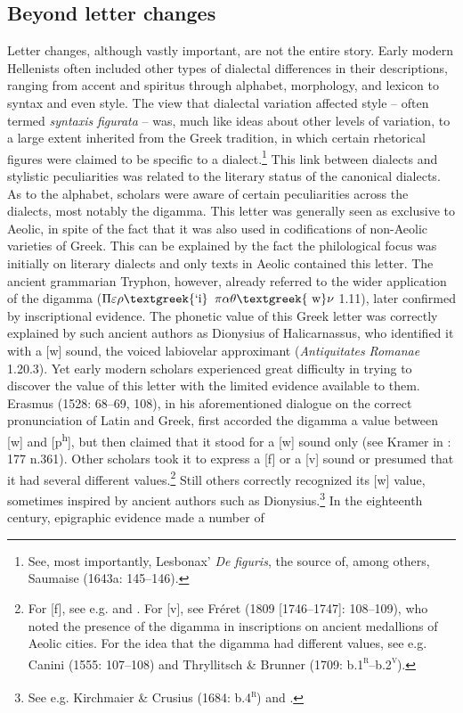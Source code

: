 \documentclass[output=paper]{langsci/langscibook}
\begin{document}
\subsection{Beyond letter changes}
\hypertarget{Toc19704846}{}\begin{styleCatalogusnotities}
Letter changes, although vastly important, are not the entire story. Early modern Hellenists often included other types of dialectal differences in their descriptions, ranging from accent and spiritus through alphabet, morphology, and lexicon to syntax and even style. The view that dialectal variation affected style – often termed \textit{syntaxis} \textit{figurata} – was, much like ideas about other levels of variation, to a large extent inherited from the Greek tradition, in which certain rhetorical figures were claimed to be specific to a dialect.\footnote{ \textrm{See, most importantly, Lesbonax’} \textrm{\textit{De} \textit{figuris}}\textrm{, the source of, among others, Saumaise (1643a: 145–146).}} This link between dialects and stylistic peculiarities was related to the literary status of the canonical dialects. As to the alphabet, scholars were aware of certain peculiarities across the dialects, most notably the digamma. This letter was generally seen as exclusive to Aeolic, in spite of the fact that it was also used in codifications of non-Aeolic varieties of Greek. This can be explained by the fact the philological focus was initially on literary dialects and only texts in Aeolic contained this letter. The ancient grammarian Tryphon, however, already referred to the wider application of the digamma ($\Pi \varepsilon \rho \text{\textgreek{`i}}$ $\pi \alpha \theta \text{\textgreek{~w}}\nu $ 1.11), later confirmed by inscriptional evidence. The phonetic value of this Greek letter was correctly explained by such ancient authors as Dionysius of Halicarnassus, who identified it with a [w] sound, the voiced labiovelar approximant (\textit{Antiquitates} \textit{Romanae} 1.20.3). Yet early modern scholars experienced great difficulty in trying to discover the value of this letter with the limited evidence available to them. Erasmus (1528: 68–69, 108), in his aforementioned dialogue on the correct pronunciation of Latin and Greek, first accorded the digamma a value between [w] and [p\textsuperscript{h}], but then claimed that it stood for a [w] sound only (see Kramer in \citealt{Erasmus1978}: 177 n.361). Other scholars took it to express a [f] or a [v] sound or presumed that it had several different values.\footnote{ \textrm{For [f], see e.g. \citet[4]{Sylvius1531} and \citet[5]{Rhenius1626}. For [v], see Fréret (1809 [1746–1747]: 108–109), who noted the presence of the digamma in inscriptions on ancient medallions of Aeolic cities. For the idea that the digamma had different values, see e.g. Canini (1555: 107–108) and Thryllitsch \& Brunner (1709: b.1}\textrm{\textsc{\textsuperscript{r}}}\textrm{–b.2}\textrm{\textsc{\textsuperscript{v}}}).} Still others correctly recognized its [w] value, sometimes inspired by ancient authors such as Dionysius.\footnote{ \textrm{See e.g. Kirchmaier \& Crusius (1684: b.4}\textrm{\textsc{\textsuperscript{r}}}\textrm{) }\textrm{and \citet[19]{Reynolds1752}.}} In the eighteenth century, epigraphic evidence made a number of 
\end{styleCatalogusnotities}
\end{document}
